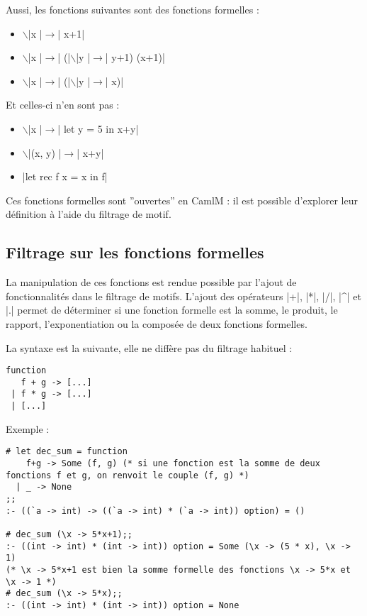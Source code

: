 \documentclass[a4paper, 12pt]{article}
\begin{document}
	Aussi, les fonctions suivantes sont des fonctions formelles :
\begin{itemize}
\item    $\backslash$|x |$\rightarrow$| x+1|
\item    $\backslash$|x |$\rightarrow$| (|$\backslash$|y |$\rightarrow$| y+1) (x+1)|
\item    $\backslash$|x |$\rightarrow$| (|$\backslash$|y |$\rightarrow$| x)|
\end{itemize}


Et celles-ci n'en sont pas :
\begin{itemize}
\item    $\backslash$|x |$\rightarrow$| let y = 5 in x+y|
\item    $\backslash$|(x, y) |$\rightarrow$| x+y|
\item    |let rec f x = x in f|
\end{itemize}

Ces fonctions formelles sont ''ouvertes'' en CamlM : il est possible d'explorer leur définition à l'aide du filtrage de motif.

\subsection{Filtrage sur les fonctions formelles}

La manipulation de ces fonctions est rendue possible par l'ajout de fonctionnalités dans le filtrage de motifs. L'ajout des opérateurs |+|, |*|, |/|, |^| et |.| permet de déterminer si une fonction formelle est la somme, le produit, le rapport, l'exponentiation ou la composée de deux fonctions formelles.

La syntaxe est la suivante, elle ne diffère pas du filtrage habituel : 
\begin{lstlisting}
function
   f + g -> [...]
 | f * g -> [...]
 | [...]
\end{lstlisting}
Exemple : 
\begin{lstlisting}
# let dec_sum = function 
    f+g -> Some (f, g) (* si une fonction est la somme de deux fonctions f et g, on renvoit le couple (f, g) *)
  | _ -> None
;;
:- ((`a -> int) -> ((`a -> int) * (`a -> int)) option) = ()

# dec_sum (\x -> 5*x+1);;
:- ((int -> int) * (int -> int)) option = Some (\x -> (5 * x), \x -> 1)
(* \x -> 5*x+1 est bien la somme formelle des fonctions \x -> 5*x et \x -> 1 *)
# dec_sum (\x -> 5*x);;
:- ((int -> int) * (int -> int)) option = None
\end{lstlisting}
\end{document}
